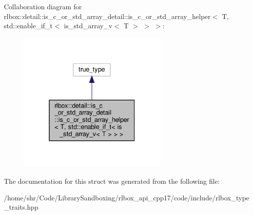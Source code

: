 Collaboration diagram for rlbox\+:\+:detail\+:\+:is\+\_\+c\+\_\+or\+\_\+std\+\_\+array\+\_\+detail\+:\+:is\+\_\+c\+\_\+or\+\_\+std\+\_\+array\+\_\+helper$<$ T, std\+:\+:enable\+\_\+if\+\_\+t$<$ is\+\_\+std\+\_\+array\+\_\+v$<$ T $>$ $>$ $>$\+:
\nopagebreak
\begin{figure}[H]
\begin{center}
\leavevmode
\includegraphics[width=211pt]{structrlbox_1_1detail_1_1is__c__or__std__array__detail_1_1is__c__or__std__array__helper_3_01T_00b9bd08b17ada9e028b847337d10afa56}
\end{center}
\end{figure}


The documentation for this struct was generated from the following file\+:\begin{DoxyCompactItemize}
\item 
/home/shr/\+Code/\+Library\+Sandboxing/rlbox\+\_\+api\+\_\+cpp17/code/include/rlbox\+\_\+type\+\_\+traits.\+hpp\end{DoxyCompactItemize}
